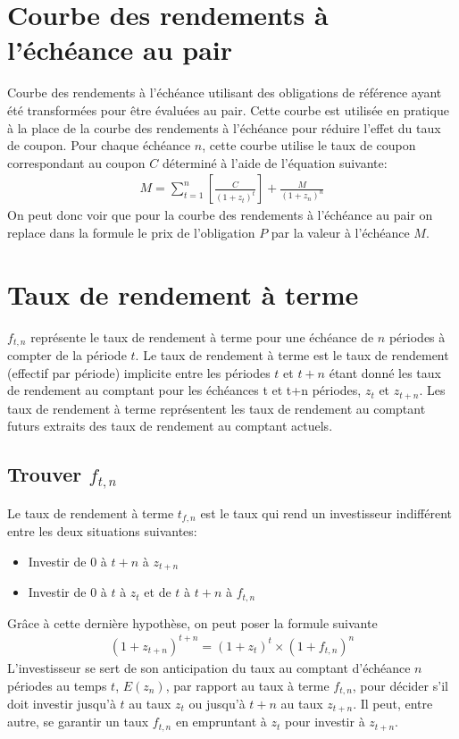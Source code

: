 \documentclass[12pt]{article}
\begin{document}
\section{Courbe des rendements à l’échéance au pair}
Courbe des rendements à l’échéance utilisant des obligations de référence ayant été transformées pour être évaluées au pair.  Cette courbe est utilisée en pratique à la place de la courbe des rendements à l’échéance pour réduire l’effet du taux de coupon.  Pour chaque échéance $n$,  cette courbe utilise le taux de coupon correspondant au coupon $C$ déterminé à l’aide de l’équation suivante:
\begin{align*}
M=\sum_{t=1}^n \left[ \frac{C}{(1+z_t)^t} \right]+\frac{M}{(1+z_n)^{n}}
\end{align*} 
On peut donc voir que pour la courbe des rendements à l’échéance au pair on replace dans la formule le prix de l'obligation $P$ par la valeur à l'échéance $M$.

\section{Taux de rendement à terme}
$f_{t,n}$ représente le taux de rendement à terme pour une échéance de $n$ périodes à compter de la période $t$.  Le taux de rendement à terme est le taux de rendement (effectif par période) implicite entre les périodes $t$ et $t+n$ étant donné les taux de rendement au comptant pour les échéances t et t+n périodes,  $z_t$ et $z_{t+n}$.  Les taux de rendement à terme représentent les taux de rendement au comptant futurs extraits des taux de rendement au comptant actuels.
\subsection{Trouver $f_{t,n}$}
Le taux de rendement à terme $t_{f,n}$ est le taux qui rend un investisseur indifférent entre les deux situations suivantes:
\begin{itemize}
\item Investir de $0$ à $t+n$ à $z_{t+n}$
\item Investir de $0$ à $t$ à $z_t$ et de $t$ à $t+n$ à $f_{t,n}$
\end{itemize}
Grâce à cette dernière hypothèse, on peut poser la formule suivante
\begin{align*}
(1+z_{t+n})^{t+n}=(1+z_t)^t \times (1+f_{t,n})^n
\end{align*}
L’investisseur se sert de son anticipation du taux au comptant d’échéance $n$ périodes au temps $t$,  $E(z_n)$,  par rapport au taux à terme $f_{t,n}$,  pour décider s’il doit investir jusqu’à $t$ au taux $z_t$ ou jusqu’à $t+n$ au taux $z_{t+n}$.  Il peut,  entre autre,  se garantir un taux $f_{t,n}$ en empruntant à $z_t$ pour investir à $z_{t+n}$.
\newpage
\end{document}
